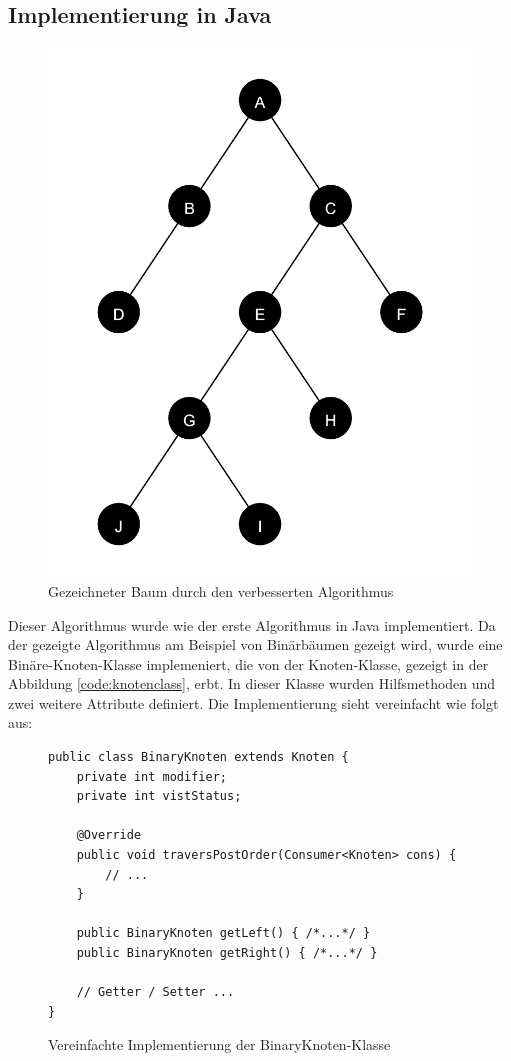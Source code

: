 \subsection{Implementierung in Java}
\begin{figure}[H]
    \centering
    \includegraphics[scale = 0.10]{abbildungen/baum_algo_2}
    \caption{Gezeichneter Baum durch den verbesserten Algorithmus}
    \label{pic:baum_algo_2} 
\end{figure}

Dieser Algorithmus wurde wie der erste Algorithmus in Java implementiert. Da der gezeigte Algorithmus
am Beispiel von Binärbäumen gezeigt wird, wurde eine Binäre-Knoten-Klasse implemeniert,
die von der Knoten-Klasse, gezeigt in der Abbildung \ref{code:knotenclass}, erbt. In dieser Klasse wurden
Hilfsmethoden und zwei weitere Attribute definiert. Die Implementierung sieht vereinfacht wie folgt aus:

\begin{figure}
\begin{lstlisting}
public class BinaryKnoten extends Knoten {
    private int modifier;
	private int vistStatus;

    @Override
	public void traversPostOrder(Consumer<Knoten> cons) { 
        // ...
    }

    public BinaryKnoten getLeft() { /*...*/ }
    public BinaryKnoten getRight() { /*...*/ }

    // Getter / Setter ...
}
\end{lstlisting}
    \caption{Vereinfachte Implementierung der BinaryKnoten-Klasse}
    \label{code:binaryknotenclass}
\end{figure}

